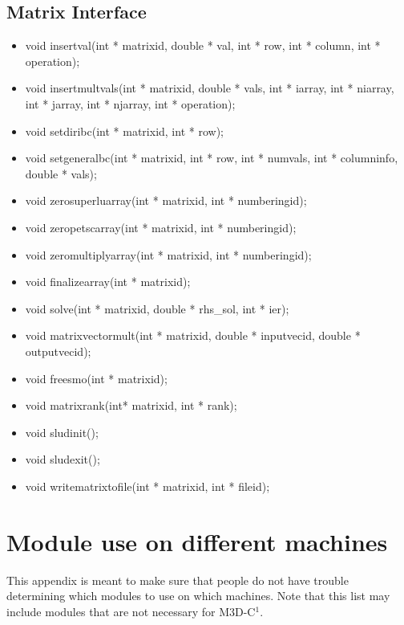 \section{Matrix Interface}
\begin{itemize}
\item   void insertval(int * matrixid, double * val, int * row,
                   int * column, int * operation);

\item   void insertmultvals(int * matrixid, double * vals, int * iarray,
                       int * niarray, int * jarray, int * njarray,
                       int * operation);

\item   void setdiribc(int * matrixid, int * row);
\item   void setgeneralbc(int * matrixid, int * row, int * numvals,
                     int * columninfo, double * vals);
\item   void zerosuperluarray(int * matrixid, int * numberingid);
\item   void zeropetscarray(int * matrixid, int * numberingid);
\item   void zeromultiplyarray(int * matrixid, int * numberingid);
\item   void finalizearray(int * matrixid);
\item   void solve(int * matrixid, double * rhs\_sol, int * ier);
\item   void matrixvectormult(int * matrixid, double * inputvecid, double * outputvecid);
\item   void freesmo(int * matrixid);
\item   void matrixrank(int* matrixid, int * rank);
\item   void sludinit();
\item   void sludexit();
\item   void writematrixtofile(int * matrixid, int * fileid);
\end{itemize}


\chapter{Module use on different machines}
This appendix is meant to make sure that people do not have trouble determining which modules to use on 
which machines.  Note that this list may include modules that are not necessary for M3D-C$^1$.


